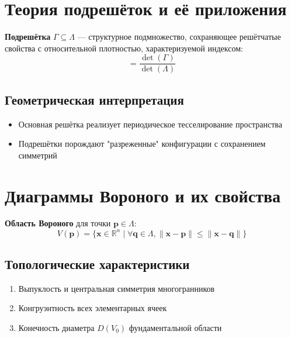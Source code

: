 \documentclass[12pt]{article}
\begin{document}
\section{Теория подрешёток и её приложения}

\begin{definition}
\textbf{Подрешётка} $\Gamma\subseteq\Lambda$ — структурное подмножество, сохраняющее решётчатые свойства с относительной плотностью, характеризуемой индексом:
\begin{equation}
[\Lambda:\Gamma] = \frac{\det(\Gamma)}{\det(\Lambda)}
\end{equation}
\end{definition}

\subsection{Геометрическая интерпретация}
\begin{itemize}
\item Основная решётка реализует периодическое тесселирование пространства
\item Подрешётки порождают "разреженные" конфигурации с сохранением симметрий
\end{itemize}

\section{Диаграммы Вороного и их свойства}

\begin{definition}
\textbf{Область Вороного} для точки $\mathbf{p}\in\Lambda$:
\begin{equation}
V(\mathbf{p}) = \{\mathbf{x}\in\mathbb{R}^n \mid \forall\mathbf{q}\in\Lambda, \|\mathbf{x}-\mathbf{p}\| \leq \|\mathbf{x}-\mathbf{q}\|\}
\end{equation}
\end{definition}

\subsection{Топологические характеристики}
\begin{enumerate}
\item Выпуклость и центральная симметрия многогранников
\item Конгруэнтность всех элементарных ячеек
\item Конечность диаметра $D(V_0)$ фундаментальной области
\end{enumerate}
\end{document}
